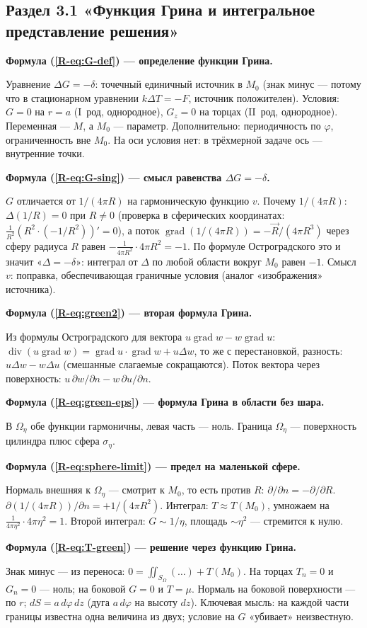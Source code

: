 \documentclass[a4paper,12pt]{article}
\newcommand{\rf}[1]{(\ref*{R-#1})}
\DeclareMathOperator{\Div}{div}
\DeclareMathOperator{\Grad}{grad}
\newcommand{\fhead}[2]{\par\medskip\textbf{Формула #1 — #2.}\par\nopagebreak[4]}
\begin{document}
\subsection{Раздел 3.1 «Функция Грина и интегральное представление решения»}

\fhead{\rf{eq:G-def}}{определение функции Грина}
Уравнение $\Delta G=-\delta$: точечный единичный источник в $M_0$ (знак
минус — потому что в стационарном уравнении $k\Delta T=-F$, источник
положителен). Условия: $G=0$ на $r=a$ (I~род, однородное), $G_z=0$ на
торцах (II~род, однородное). Переменная — $M$, а $M_0$ — параметр.
Дополнительно: периодичность по $\varphi$, ограниченность вне $M_0$.
На оси условия нет: в трёхмерной задаче ось — внутренние точки.

\fhead{\rf{eq:G-sing}}{смысл равенства $\Delta G=-\delta$}
$G$ отличается от $1/(4\pi R)$ на гармоническую функцию $v$. Почему
$1/(4\pi R)$: $\Delta(1/R)=0$ при $R\ne0$ (проверка в сферических
координатах: $\frac{1}{R^2}(R^2\cdot(-1/R^2))'=0$), а поток
$\Grad(1/(4\pi R))=-\vec R/(4\pi R^3)$ через сферу радиуса $R$ равен
$-\frac{1}{4\pi R^2}\cdot4\pi R^2=-1$. По формуле Остроградского это и
значит «$\Delta=-\delta$»: интеграл от $\Delta$ по любой области вокруг
$M_0$ равен $-1$. Смысл $v$: поправка, обеспечивающая граничные условия
(аналог «изображения» источника).

\fhead{\rf{eq:green2}}{вторая формула Грина}
Из формулы Остроградского для вектора $u\Grad w-w\Grad u$:
$\Div(u\Grad w)=\Grad u\cdot\Grad w+u\Delta w$, то же с перестановкой,
разность: $u\Delta w-w\Delta u$ (смешанные слагаемые сокращаются).
Поток вектора через поверхность: $u\,\partial w/\partial n-w\,\partial u/\partial n$.

\fhead{\rf{eq:green-eps}}{формула Грина в области без шара}
В $\Omega_\eta$ обе функции гармоничны, левая часть — ноль. Граница
$\Omega_\eta$ — поверхность цилиндра плюс сфера $\sigma_\eta$.

\fhead{\rf{eq:sphere-limit}}{предел на маленькой сфере}
Нормаль внешняя к $\Omega_\eta$ — смотрит к $M_0$, то есть против $R$:
$\partial/\partial n=-\partial/\partial R$. $\partial(1/(4\pi R))/\partial n
=+1/(4\pi R^2)$. Интеграл: $T\approx T(M_0)$, умножаем на
$\frac{1}{4\pi\eta^2}\cdot4\pi\eta^2=1$. Второй интеграл:
$G\sim1/\eta$, площадь $\sim\eta^2$ — стремится к нулю.

\fhead{\rf{eq:T-green}}{решение через функцию Грина}
Знак минус — из переноса: $0=\iint_{S_\Omega}(\dots)+T(M_0)$. На торцах
$T_n=0$ и $G_n=0$ — ноль; на боковой $G=0$ и $T=\mu$. Нормаль на боковой
поверхности — по $r$; $dS=a\,d\varphi\,dz$ (дуга $a\,d\varphi$ на высоту
$dz$). Ключевая мысль: на каждой части границы известна одна величина из
двух; условие на $G$ «убивает» неизвестную.
\end{document}
